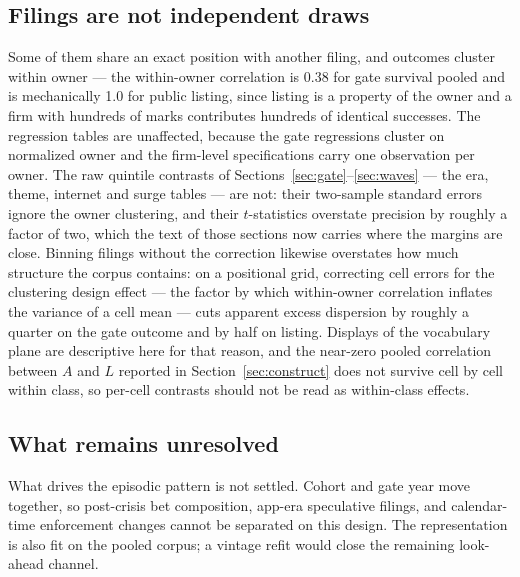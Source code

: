\subsection{Filings are not independent draws}

Some of them share an exact position
with another filing, and outcomes cluster within owner --- the
within-owner correlation is 0.38 for gate survival pooled and is mechanically
1.0 for public listing, since listing is a property of the owner and a
firm with hundreds of marks contributes hundreds of identical successes.
The regression tables are unaffected, because the gate regressions cluster
on normalized owner and the firm-level specifications carry one
observation per owner. The raw quintile contrasts of
Sections~\ref{sec:gate}--\ref{sec:waves} --- the era, theme, internet
and surge tables --- are not: their two-sample standard errors ignore the
owner clustering, and their $t$-statistics overstate precision by roughly a
factor of two, which the text of those sections now carries where the
margins are close. Binning filings without the correction likewise
overstates how much structure the corpus contains: on a
positional grid, correcting cell errors for the clustering design effect ---
the factor by which within-owner correlation inflates the variance of a cell
mean --- cuts
apparent excess dispersion by roughly a quarter on the gate outcome and
by half on listing. Displays of the vocabulary plane are descriptive
here for that reason, and the near-zero pooled correlation between $A$ and
$L$ reported in Section~\ref{sec:construct} does not survive cell by cell
within class, so per-cell contrasts should not be read as within-class
effects.

\subsection{What remains unresolved}

What drives the episodic pattern is not settled. Cohort and gate year
move together, so post-crisis bet composition, app-era speculative filings,
and calendar-time enforcement changes cannot be separated on this design.
The representation is also fit on the pooled corpus; a vintage refit would
close the remaining look-ahead channel.

